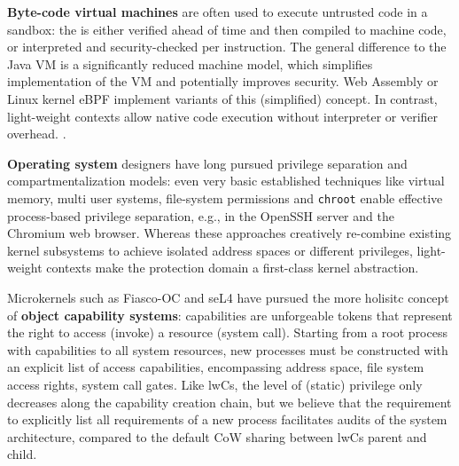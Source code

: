 \documentclass[10pt,twocolumn,letter]{article}
\begin{document}
\textbf{Byte-code virtual machines} are often used to execute untrusted code in a sandbox:
the is either verified ahead of time and then compiled to machine code, or interpreted and security-checked per instruction.
The general difference to the Java VM is a significantly reduced machine model, which simplifies implementation of the VM and potentially improves security.
Web Assembly or Linux kernel eBPF implement variants of this (simplified) concept.
In contrast, light-weight contexts allow native code execution without interpreter or verifier overhead.
\cite{haas2017bringingwebassembly, lwnebpf}.

\textbf{Operating system} designers have long pursued privilege separation and compartmentalization models:
even very basic established techniques like virtual memory, multi user systems, file-system permissions and \lstinline{chroot} enable effective process-based privilege separation, e.g., in the OpenSSH server and the Chromium web browser.
Whereas these approaches creatively re-combine existing kernel subsystems to achieve isolated address spaces or different privileges, light-weight contexts make the protection domain a first-class kernel abstraction.
\cite{provos2003preventing, barth2008security}

Microkernels such as Fiasco-OC and seL4 have pursued the more holisitc concept of \textbf{object capability systems}:
capabilities are unforgeable tokens that represent the right to access (invoke) a resource (system call).
Starting from a root process with capabilities to all system resources, new processes must be constructed with an explicit list of access capabilities, encompassing address space, file system access rights, system call gates.
Like lwCs, the level of (static) privilege only decreases along the capability creation chain, but we believe that the requirement to explicitly list all requirements of a new process facilitates audits of the system architecture, compared to the default CoW sharing between lwCs parent and child.
\cite{elphinstone2013l3}
\end{document}

